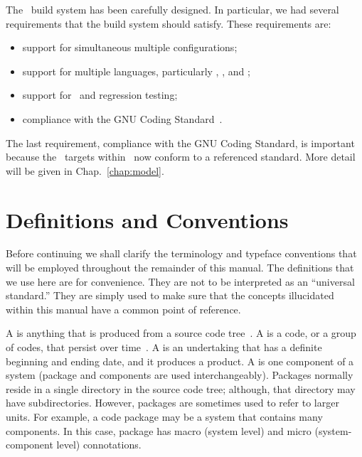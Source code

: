 The \draco\ build system has been carefully designed.  In particular,
we had several requirements that the build system should satisfy.
These requirements are:
\begin{itemize}
\item support for simultaneous multiple configurations;
\item support for multiple languages, particularly \cpp, \cc, and
  \python;
\item support for \dejagnu\ and regression testing;
\item compliance with the GNU Coding Standard~\cite{gnu}.
\end{itemize}
The last requirement, compliance with the GNU Coding Standard, is
important because the \gmake\ targets within \draco\ now conform to a
referenced standard.  More detail will be given in
Chap.~\ref{chap:model}.


\section{Definitions and Conventions}

Before continuing we shall clarify the terminology and typeface
conventions that will be employed throughout the remainder of this
manual.  The definitions that we use here are for convenience.  They
are not to be interpreted as an ``universal standard.''  They are
simply used to make sure that the concepts illucidated within this
manual have a common point of reference.

A  is anything that is produced from a source code
tree~\cite{ja94}.  A  is a code, or a group of codes,
that persist over time~\cite{tn98}.  A  is an
undertaking that has a definite beginning and ending date, and it
produces a product.  A  is one component of a system
(package and components are used interchangeably).  Packages normally
reside in a single directory in the source code tree; although, that
directory may have subdirectories.  However, packages are sometimes
used to refer to larger units.  For example, a code package may be a
system that contains many components.  In this case, package has macro
(system level) and micro (system-component level) connotations.

